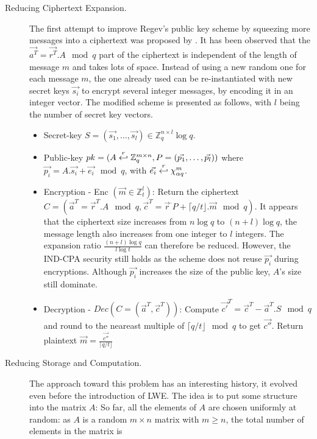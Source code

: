 \begin{description}
\item[Reducing Ciphertext Expansion.] The first attempt to improve Regev's public key scheme by squeezing more messages into a ciphertext was proposed by
  \cite{peikert2008framework} .  It has been observed that the
  $\vec{a^T} = \vec{r^T}. A \mod q$ part of the ciphertext is independent of the length of
  message $m$ and takes lots of space. Instead of using a new random one for
  each message $m$, the one already used can be re-instantiated with new secret keys
  $\vec{s_i}$ to encrypt several integer messages, by encoding it in an integer
  vector. The modified scheme is presented as follows, with $l$ being the number
  of secret key vectors.
  \begin{itemize}
  \item Secret-key
    $S = (\vec{s_1}, \dots, \vec{s_l}) \in \mathbb{Z}_q^{n \times l} \log q$.
  \item Public-key
    $pk = (A \stackrel{r}{\hookleftarrow} \mathbb{Z}_q^{m \times n},P=(\vec{p_1}, \dots,
    \vec{p_l}))$ where $\vec{p_i} = A.\vec{s_i} + \vec{e_i} \mod q$, with
    $\vec{e_i} \stackrel{r}{\hookleftarrow} \chi_{\alpha q}^m$.
  \item Encryption - Enc $(\vec{m} \in \mathbb{Z}_t^l)$: Return the ciphertext
    $C = (\vec{a}^T= \vec{r}^T.A \mod q, \vec{c}^T = \vec{r}^.P + \lceil q/t
    \rfloor . \vec{m} \mod q)$. It appears that the ciphertext size increases from
    $n\log q$ to $(n+l)\log q$, the message length also increases from one
    integer to $l$ integers. The expansion ratio $\frac{(n+l)\log q}{l \log t}$
    can therefore be reduced. However, the IND-CPA security still holds as the scheme
    does not reuse $\vec{p_i}$ during encryptions. Although $\vec{p_i}$ increases the size of
    the public key, $A$'s size still dominate.
  \item Decryption - $Dec(C = (\vec{a}^T, \vec{c}^T))$: Compute
    $\vec{c'}^T = \vec{c}^T - \vec{a}^T.S \mod q$ and round to the neareast
    multiple of $\lceil q/t \rfloor \mod q$ to get $\vec{c''}$. Return plaintext
    $\vec{m} = \frac{\vec{c''}}{\lceil q/t \rfloor}$
  \end{itemize}
\item [Reducing Storage and Computation.] The approach toward this problem has
  an interesting history, it evolved even before the introduction of LWE. The
  idea is to put some structure into the matrix $A$: So far, all the elements of
  $A$ are chosen uniformly at random: as $A$ is a random $m \times n$
  matrix with $m \geq n$, the total number of elements in the matrix is

\end{description}
